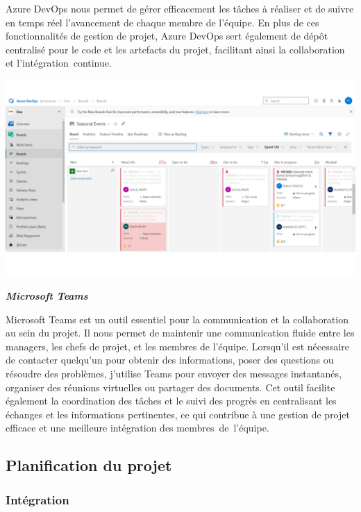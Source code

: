 Azure DevOps nous permet de gérer efficacement les tâches à réaliser et de suivre en temps réel l'avancement de chaque membre de l'équipe. En plus de ces fonctionnalités de gestion de projet, Azure DevOps sert également de dépôt centralisé pour le code et les artefacts du projet, facilitant ainsi la collaboration et l'intégration continue.
\begin{center}
    \centering
    \includegraphics[width=18cm]{Figures/azure DevOps-tickets.png}
\end{center}

\textbf{\textbullet \textit{Microsoft Teams}}

Microsoft Teams est un outil essentiel pour la communication et la collaboration au sein du projet. Il nous permet de maintenir une communication fluide entre les managers, les chefs de projet, et les membres de l'équipe. Lorsqu'il est nécessaire de contacter quelqu'un pour obtenir des informations, poser des questions ou résoudre des problèmes, j'utilise Teams pour envoyer des messages instantanés, organiser des réunions virtuelles ou partager des documents. Cet outil facilite également la coordination des tâches et le suivi des progrès en centralisant les échanges et les informations pertinentes, ce qui contribue à une gestion de projet efficace et une meilleure intégration des membres de l'équipe.


\subsection{Planification du projet}

\subsubsection{Intégration}


